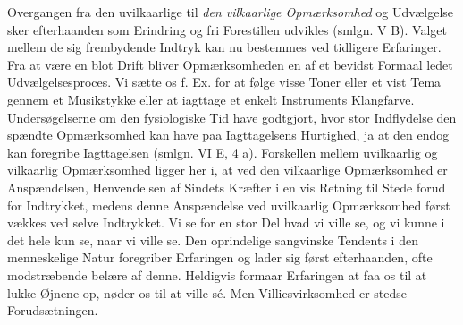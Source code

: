 \documentclass[12pt,a4paper,openany]{book}
\newcommand{\opage}[1]{\marginnote{\footnotesize\textit{[#1]}}}
\begin{document}
Overgangen fra den uvilkaarlige til \emph{den vilkaarlige Opmærksomhed}
og Udvælgelse sker efterhaanden som Erindring og fri Forestillen
udvikles (smlgn. V B). Valget mellem de sig frembydende Indtryk kan nu
bestemmes ved tidligere Erfaringer. Fra at være en blot Drift bliver
Opmærksomheden en af et bevidst Formaal ledet Udvælgelsesproces. Vi
sætte os f. Ex. for at følge visse Toner eller et vist Tema gennem et
Musikstykke eller at iagttage et enkelt Instruments Klangfarve.
Undersøgelserne om den fysiologiske Tid have godtgjort, hvor stor
Indflydelse den spændte Opmærksomhed kan
\opage{373}have paa Iagttagelsens Hurtighed, ja at den endog kan
foregribe Iagttagelsen (smlgn. VI E, 4 a). Forskellen mellem uvilkaarlig
og vilkaarlig Opmærksomhed ligger her i, at ved den vilkaarlige
Opmærksomhed er Anspændelsen, Henvendelsen af Sindets Kræfter i en vis
Retning til Stede forud for Indtrykket, medens denne Anspændelse ved
uvilkaarlig Opmærksomhed først vækkes ved selve Indtrykket. Vi se for en
stor Del hvad vi ville se, og vi kunne i det hele kun se, naar vi ville
se. Den oprindelige sangvinske Tendents i den menneskelige Natur
foregriber Erfaringen og lader sig først efterhaanden, ofte modstræbende
belære af denne. Heldigvis formaar Erfaringen at faa os til at lukke
Øjnene op, nøder os til at ville sé. Men Villiesvirksomhed er stedse
Forudsætningen.
\end{document}
